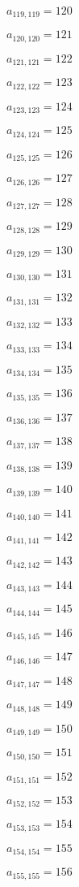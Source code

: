 \documentclass[a4paper,12pt]{article}
\begin{document}
$a _{ 119, 119 } = 120$

$a _{ 120, 120 } = 121$

$a _{ 121, 121 } = 122$

$a _{ 122, 122 } = 123$

$a _{ 123, 123 } = 124$

$a _{ 124, 124 } = 125$

$a _{ 125, 125 } = 126$

$a _{ 126, 126 } = 127$

$a _{ 127, 127 } = 128$

$a _{ 128, 128 } = 129$

$a _{ 129, 129 } = 130$

$a _{ 130, 130 } = 131$

$a _{ 131, 131 } = 132$

$a _{ 132, 132 } = 133$

$a _{ 133, 133 } = 134$

$a _{ 134, 134 } = 135$

$a _{ 135, 135 } = 136$

$a _{ 136, 136 } = 137$

$a _{ 137, 137 } = 138$

$a _{ 138, 138 } = 139$

$a _{ 139, 139 } = 140$

$a _{ 140, 140 } = 141$

$a _{ 141, 141 } = 142$

$a _{ 142, 142 } = 143$

$a _{ 143, 143 } = 144$

$a _{ 144, 144 } = 145$

$a _{ 145, 145 } = 146$

$a _{ 146, 146 } = 147$

$a _{ 147, 147 } = 148$

$a _{ 148, 148 } = 149$

$a _{ 149, 149 } = 150$

$a _{ 150, 150 } = 151$

$a _{ 151, 151 } = 152$

$a _{ 152, 152 } = 153$

$a _{ 153, 153 } = 154$

$a _{ 154, 154 } = 155$

$a _{ 155, 155 } = 156$
\end{document}
